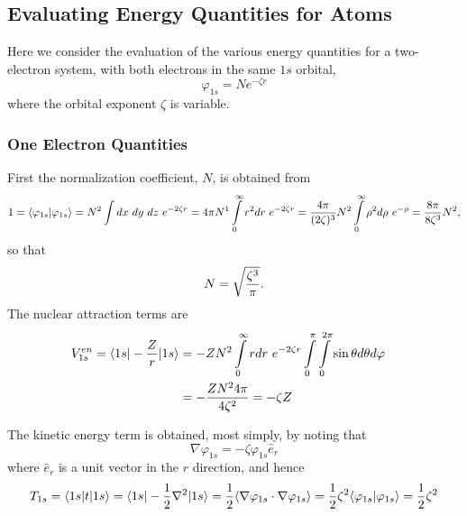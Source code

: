 \subsection{Evaluating Energy Quantities for Atoms}
\label{chap3-app-c}

Here we consider the evaluation of the various energy quantities for a 
two-electron system, with both electrons in the same $1s$ orbital,
\begin{equation}
\varphi_{1s} = Ne^{- \zeta r}
\end{equation}
where the orbital exponent $\zeta$ is variable.

\subsubsection{One Electron Quantities}

First the normalization coefficient, $N$, is obtained from
\begin{equation}
1 = \langle \varphi_{1s} \vert \varphi_{1s} \rangle = N^2 
\int dx\ dy\ dz\ e^{-2 
\zeta r} = 4 \pi N^1 \int\limits^{\infty}_{0} r^2 dr\ e^{-2 \zeta r} = 
{4 \pi \over (2 \zeta )^3} N^2 \int\limits^{\infty}_{0} \rho^2 d \rho 
\ e^{- \rho} = {8 \pi \over 8 \zeta^3} N^2 ,
\end{equation}
so that
\begin{equation}
N = \sqrt{{\zeta^3 \over \pi}} .
\end{equation}
The nuclear attraction terms are
\begin{eqnarray}
V^{en}_{1s} = \langle 1s \vert - {Z \over r} \vert 1s 
\rangle &= - ZN^2 \int\limits^{\infty}_{0} rdr\ e^{-2 \zeta r} 
\int\limits^{\pi}_{0} \int\limits^{2 \pi}_{0} \sin \theta d \theta d 
\varphi\cr
&= - {ZN^2 4 \pi \over 4 \zeta^2} = - \zeta Z\cr
%
\label{chap3app-eqno10}
\end{eqnarray}

The kinetic energy term is obtained, most simply, by noting that
\begin{equation}
\nabla \varphi_{1s} = - \zeta \varphi_{1s} {\hat e}_r
\end{equation}
where ${\hat e}_r$ is a unit vector in the $r$ direction, and hence
\begin{equation}
T_{1s} = \langle 1s \vert t \vert 1s \rangle = \langle 
1s \vert - {1 \over 2} \nabla^2 \vert 1s \rangle = {1 \over 2} 
\langle \nabla \varphi_{1s} \cdot \nabla \varphi_{1s} \rangle = {1 \over 
2} \zeta^2 \langle \varphi_{1s} \vert \varphi_{1s} \rangle = {1 \over 2} 
\zeta^2
\label{chap3app-eqno11}
\end{equation}

